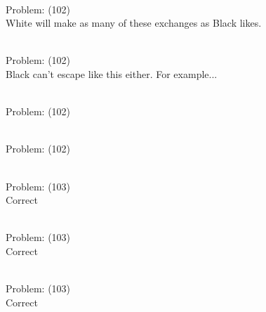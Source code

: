 \documentclass[11pt]{article}
\begin{document}
\begin{minipage}[t]{0.5\textwidth}
  {\centering
  
\\
Problem: (102)\\
White will make as many of these exchanges as Black likes.\\
  }
\end{minipage}
\begin{minipage}[t]{0.5\textwidth}
  {\centering
  
\\
Problem: (102)\\
Black can't escape like this either. For example...\\
  }
\end{minipage}
\begin{minipage}[t]{0.5\textwidth}
  {\centering
  
\\
Problem: (102)\\
  }
\end{minipage}
\begin{minipage}[t]{0.5\textwidth}
  {\centering
  
\\
Problem: (102)\\
  }
\end{minipage}
\begin{minipage}[t]{0.5\textwidth}
  {\centering
  
\\
Problem: (103)\\
Correct\\
  }
\end{minipage}
\begin{minipage}[t]{0.5\textwidth}
  {\centering
  
\\
Problem: (103)\\
Correct\\
  }
\end{minipage}
\begin{minipage}[t]{0.5\textwidth}
  {\centering
  
\\
Problem: (103)\\
Correct\\
  }
\end{minipage}
\end{document}
